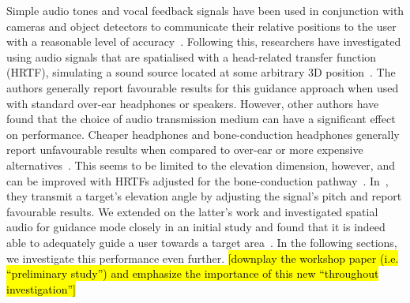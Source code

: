 \documentclass{article}
\DeclareRobustCommand{\tofix}[1]{{\sethlcolor{yellow}\hl{[#1]}}}
\begin{document}
Simple audio tones and vocal feedback signals have been used in conjunction with cameras and object detectors to communicate their relative positions to the user with a reasonable level of accuracy~\cite{schauerte2012assistive,tian2013computer,fiannaca2014headlock,vazquez2012helping}.
Following this, researchers have investigated using audio signals that are spatialised with a head-related transfer function (HRTF), simulating a sound source located at some arbitrary 3D position~\cite{geronazzo2016interactive,wilson2007swan,katz2010navig,blum2013spatialized}.
The authors generally report favourable results for this guidance approach when used with standard over-ear headphones or speakers. 
However, other authors have found that the choice of audio transmission medium can have a significant effect on performance.
Cheaper headphones and bone-conduction headphones generally report unfavourable results when compared to over-ear or more expensive alternatives~\cite{schonstein2008comparison,macdonald2006spatial,stanley2006lateralization}. 
This seems to be limited to the elevation dimension, however, and can be improved with HRTFs adjusted for the bone-conduction pathway~\cite{stanley2006lateralization}.
In~\cite{durette2008visuo}, they transmit a target's elevation angle by adjusting the signal's pitch and report favourable results. 
We extended on the latter's work and investigated spatial audio for guidance mode closely in an initial study and found that it is indeed able to adequately guide a user towards a target area~\cite{lock2019bone}.
In the following sections, we investigate this performance even further.
\tofix{downplay the workshop paper (i.e. ``preliminary study'') and emphasize the importance of this new ``throughout investigation''}
\end{document}

